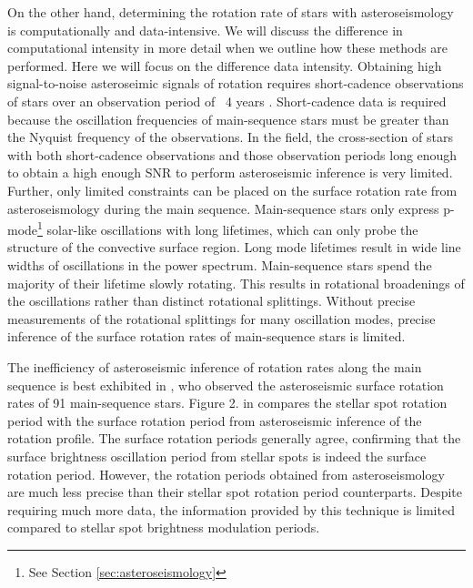 

On the other hand, determining the rotation rate of stars with asteroseismology is computationally and data-intensive.
We will discuss the difference in computational intensity in more detail when we outline how these methods are performed.
Here we will focus on the difference data intensity.
Obtaining high signal-to-noise asteroseimic signals of rotation requires short-cadence observations of stars over an observation period of ~4 years \citep{deheuvels_seismic_2014}. 
Short-cadence data is required because the oscillation frequencies of main-sequence stars must be greater than the Nyquist frequency of the observations.
In the \kepler{} field, the cross-section of stars with both short-cadence observations and those observation periods long enough to obtain a high enough SNR to perform asteroseismic inference is very limited.
Further, only limited constraints can be placed on the surface rotation rate from asteroseismology during the main sequence.
Main-sequence stars only express p-mode\footnote{See Section \ref{sec:asteroseismology}} solar-like oscillations with long lifetimes, which can only probe the structure of the convective surface region.
Long mode lifetimes result in wide line widths of oscillations in the power spectrum.
Main-sequence stars spend the majority of their lifetime slowly rotating.
This results in rotational broadenings of the oscillations rather than distinct rotational splittings.
Without precise measurements of the rotational splittings for many oscillation modes, precise inference of the surface rotation rates of main-sequence stars is limited.

The inefficiency of asteroseismic inference of rotation rates along the main sequence is best exhibited in \citet{hall_weakened_2021}, who observed the asteroseismic surface rotation rates of 91 main-sequence stars.
Figure 2. in \citet{hall_weakened_2021} compares the stellar spot rotation period with the surface rotation period from asteroseismic inference of the rotation profile.
The surface rotation periods generally agree, confirming that the surface brightness oscillation period from stellar spots is indeed the surface rotation period.
However, the rotation periods obtained from asteroseismology are much less precise than their stellar spot rotation period counterparts.
Despite requiring much more data, the information provided by this technique is limited compared to stellar spot brightness modulation periods.

